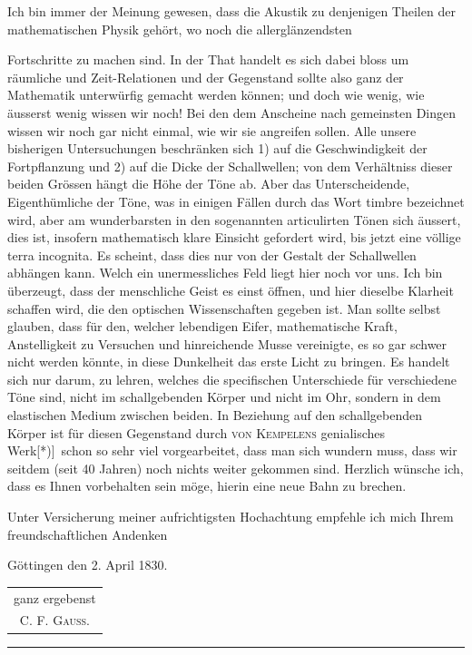 Ich bin immer der Meinung gewesen, dass die Akustik zu denjenigen Theilen der mathematischen Physik gehört, wo noch die allerglänzendsten
\par\HistoricalFoot{}{22\textsuperscript{*}}
\clearpage{}
\noindent Fortschritte zu machen sind. In der That handelt es sich dabei bloss um räumliche und Zeit-Relationen und der Gegenstand sollte also ganz der Mathematik unterwürfig gemacht werden können; und doch wie wenig, wie äusserst wenig wissen wir noch! Bei den dem Anscheine nach gemeinsten Dingen wissen wir noch gar nicht einmal, wie wir sie angreifen sollen. Alle unsere bisherigen Untersuchungen beschränken sich 1) auf die Geschwindigkeit der Fortpflanzung und 2) auf die Dicke der Schallwellen; von dem Verhältniss dieser beiden Grössen hängt die Höhe der Töne ab. Aber das Unterscheidende, Eigenthümliche der Töne, was in einigen Fällen durch das Wort timbre bezeichnet wird, aber am wunderbarsten in den sogenannten articulirten Tönen sich äussert, dies ist, insofern mathematisch klare Einsicht gefordert wird, bis jetzt eine völlige terra incognita. Es scheint, dass dies nur von der Gestalt der Schallwellen abhängen kann. Welch ein unermessliches Feld liegt hier noch vor uns. Ich bin überzeugt, dass der menschliche Geist es einst öffnen, und hier dieselbe Klarheit schaffen wird, die den optischen Wissenschaften gegeben ist. Man sollte selbst glauben, dass für den, welcher lebendigen Eifer, mathematische Kraft, Anstelligkeit zu Versuchen und hinreichende Musse vereinigte, es so gar schwer nicht werden könnte, in diese Dunkelheit das erste Licht zu bringen. Es handelt sich nur darum, zu lehren, welches die specifischen Unterschiede für verschiedene Töne sind, nicht im schallgebenden Körper und nicht im Ohr, sondern in dem elastischen Medium zwischen beiden. In Beziehung auf den schallgebenden Körper ist für diesen Gegenstand durch \textsc{von Kempelens} genialisches Werk[*)]\begingroup\renewcommand{\thefootnote}{}\endgroup\ schon so sehr viel vorgearbeitet, dass man sich wundern muss, dass wir seitdem (seit 40 Jahren) noch nichts weiter gekommen sind. Herzlich wünsche ich, dass es Ihnen vorbehalten sein möge, hierin eine neue Bahn zu brechen.

Unter Versicherung meiner aufrichtigsten Hochachtung empfehle ich mich Ihrem freundschaftlichen Andenken
\par\medskip
\noindent\hspace*{\parindent}Göttingen den 2. April 1830.\hfill\begin{tabular}[t]{@{}c@{}}ganz ergebenst\\C. F. \textsc{Gauss}.\end{tabular}\hspace*{\parindent}
\par\vspace{2\baselineskip}\begin{center}\rule{.25\linewidth}{.4pt}\end{center}
\clearpage\endgroup
